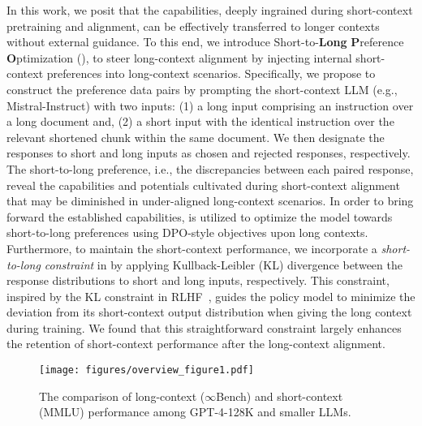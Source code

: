In this work, we posit that the capabilities, deeply ingrained during short-context pretraining and alignment, can be effectively transferred to longer contexts without external guidance. To this end, we introduce Short-to-\textbf{Long} \textbf{P}reference \textbf{O}ptimization (\textbf{\ourMethod}), to steer long-context alignment by injecting internal short-context preferences into long-context scenarios. Specifically, we propose to construct the preference data pairs by prompting the short-context LLM (e.g., Mistral-Instruct) with two inputs: (1) a long input comprising an instruction over a long document and,  (2) a short input with the identical instruction over the relevant shortened chunk within the same document. We then designate the responses to short and long inputs as chosen and rejected responses, respectively. The short-to-long preference, i.e., the discrepancies between each paired response, reveal the capabilities and potentials cultivated during short-context alignment that may be diminished in under-aligned long-context scenarios. 
In order to bring forward the established capabilities, \ourMethod{} is utilized to optimize the model towards short-to-long preferences using DPO-style objectives upon long contexts. Furthermore, to maintain the short-context performance, we incorporate a \textit{short-to-long constraint} in \ourMethod{} by applying Kullback-Leibler (KL) divergence between the response distributions to short and long inputs, respectively. This constraint, inspired by the KL constraint in RLHF~\citep{Ouyang2022TrainingLM,stiennon2020learning}, guides the policy model to minimize the deviation from its short-context output distribution when giving the long context during training. We found that this straightforward constraint largely enhances the retention of short-context performance after the long-context alignment.
\begin{figure}[!t]
    \centering
    \texttt{[image: figures/overview\_figure1.pdf]}
    \vspace{-0.3em}
    \caption{The comparison of long-context ($\infty$Bench) and short-context (MMLU) performance among GPT-4-128K and smaller LLMs.}
    \label{fig:comparion_overview}
\end{figure}

